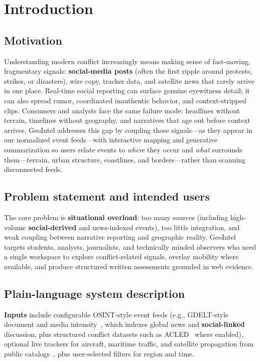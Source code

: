 \section{Introduction}

\subsection{Motivation}

Understanding modern conflict increasingly means making sense of fast-moving, fragmentary signals: \textbf{social-media posts} (often the first ripple around protests, strikes, or disasters), wire copy, tracker data, and satellite news that rarely arrive in one place. Real-time social reporting can surface genuine eyewitness detail; it can also spread rumor, coordinated inauthentic behavior, and context-stripped clips. Consumers and analysts face the same failure mode: headlines without terrain, timelines without geography, and narratives that age out before context arrives. GeoIntel addresses this gap by coupling those signals---as they appear in our normalized event feeds---with interactive mapping and generative summarization so users relate events to \emph{where} they occur and \emph{what} surrounds them---terrain, urban structure, coastlines, and borders---rather than scanning disconnected feeds.

\subsection{Problem statement and intended users}

The core problem is \textbf{situational overload}: too many sources (including high-volume \textbf{social-derived} and news-indexed events), too little integration, and weak coupling between narrative reporting and geographic reality. GeoIntel targets students, analysts, journalists, and technically minded observers who need a single workspace to explore conflict-related signals, overlay mobility where available, and produce structured written assessments grounded in web evidence.

\subsection{Plain-language system description}

\textbf{Inputs} include configurable OSINT-style event feeds (e.g., GDELT-style document and media intensity~\cite{gdelt}, which indexes global news and \textbf{social-linked} discussion, plus structured conflict datasets such as ACLED~\cite{acled} where enabled), optional live trackers for aircraft, maritime traffic, and satellite propagation from public catalogs~\cite{celestrak}, plus user-selected filters for region and time.

